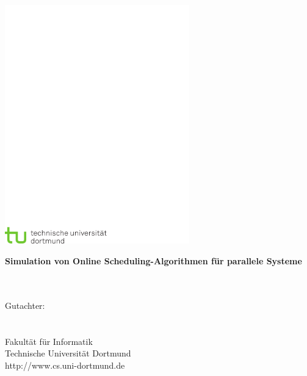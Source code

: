 \thispagestyle{empty}
\begin{titlepage}
\vspace*{-2cm}
\newlength{\links}
\setlength{\links}{-0.5cm} \sf \LARGE



\hspace*{\links}
\begin{minipage}{12.5cm}
\includegraphics[width=8cm]{coverpage/tud_logo_cmyk}
\end{minipage}

\vspace*{4cm}

\hspace*{\links}
\hspace*{-0.2cm}
\begin{minipage}{9cm}
\large
\begin{center}
\bf{Simulation von Online Scheduling-Algorithmen für parallele Systeme} \\
\vspace*{1cm}
{\small \Untertitel} \\
\vspace*{1.5cm}
\Autor\\
\Date
\end{center}
\end{minipage}



\vfill

\hspace*{\links}
\begin{minipage}[b]{15cm}
\normalsize
\raggedright
%
\vspace*{2.5cm}
%
\normalsize \raggedright
Gutachter: \\
\Supervisor \\
\otherSupervisor \\ 
\vspace*{1.5cm}
\textcolor{TUGreen}{Fakultät für Informatik\\
Technische Universität Dortmund \\
http://www.cs.uni-dortmund.de}
\end{minipage}


\end{titlepage}
